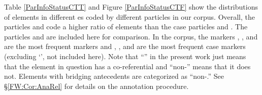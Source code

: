 Table \ref{ParInfoStatusCTT} and Figure \ref{ParInfoStatusCTF} show the distributions of elements in different es coded by different particles in our corpus.
Overall, the  particles  and  code a higher ratio of  elements than the case particles  and .
The particles  and  are included here for comparison.
In the corpus, the markers , , and  are the most frequent  markers and 
, , and  are the most frequent case markers (excluding  `', not included here). %
Note that ``'' in the present work just means that the element in question has a co-referential  and ``non-'' means that it does not. Elements with bridging antecedents are categorized as ``non-.''
See \S \ref{FW:Cor:AnaRel} for details on the annotation procedure.
